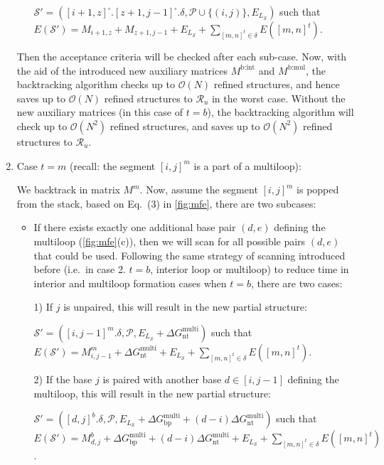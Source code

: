 \documentclass[11pt,letterpaper]{article}  \usepackage[margin=1in]{geometry}
\theoremstyle{definition}  \newtheorem{Definition}[theorem]{Definition}
\begin{document}
\begin{enumerate}
\begin{itemize}
		$\mathcal{S}' = ([i+1,z]^\square.[z+1,j-1]^\square.\delta, \mathcal{P} \cup \{(i,j)\}, E_{L_{\mathcal{S}}})$ such that $E(\mathcal{S}') = M_{i+1,z} +  M_{z+1,j-1} +  E_{L_{\mathcal{S}}} + \sum \limits_{[m,n]^t \in \delta} E([m,n]^t)$.   
		
		
		
	\end{itemize}
	
	Then the acceptance criteria will be checked after each sub-case. Now, with the aid of the introduced new auxiliary matrices $M^\text{b:int}$ and $M^\text{b:mul}$, the backtracking algorithm checks up to $\mathcal{O}(N)$ refined structures, and hence saves up to  $\mathcal{O}(N)$ refined structures to $\mathcal{R}_u$ in the worst case. Without the  new auxiliary matrices (in this case of $t=b$), the backtracking algorithm will check up to $\mathcal{O}(N^2)$ refined structures, and saves up to  $\mathcal{O}(N^2)$ refined structures to $\mathcal{R}_u$.
	
	
	\item
	Case $t = m$ 	(recall: the segment $[i,j]^m$ is a part of a multiloop): 
	
	We backtrack in matrix $M^m$. 
	Now, assume the segment $[i,j]^m$ is popped from the stack, based on Eq.~(3) in \cref{fig:mfe},  there are two subcases:
	
	\begin{itemize}
		\item  If there exists exactly one additional base pair $(d,e)$ defining the multiloop (\cref{fig:mfe}(c)), then we will scan for all possible pairs $(d,e)$ that could be used. Following the same strategy of scanning introduced before (i.e.~in case 2. $t=b$, interior loop or multiloop) to reduce time in interior and multiloop formation cases when $t = b$, there are two cases: 
		
		1) If $j$ is unpaired, this will
		result in the new partial structure: 
		
		$\mathcal{S}' = ([i,j-1]^m.\delta, \mathcal{P}, E_{L_{\mathcal{S}}} + \Delta G_\text{nt}^\text{multi})$ such that $E(\mathcal{S}') = M_{i,j-1}^m + \Delta G_\text{nt}^\text{multi} +E_{L_{\mathcal{S}}} + \sum \limits_{[m,n]^t \in \delta} E([m,n]^t)$. 	 	
		
		2) If the base $j$ is paired with another base $d \in [i,j-1]$ defining the multiloop, this will result in the new partial structure: 
		
		$\mathcal{S}' = ([d,j]^b.\delta, \mathcal{P}, E_{L_{\mathcal{S}}} + \Delta G_\text{bp}^\text{multi} + (d-i) \Delta G_\text{nt}^\text{multi})$ such that $E(\mathcal{S}') = M^b_{d,j} + \Delta G_\text{bp}^\text{multi}+ (d-i) \Delta G_\text{nt}^\text{multi} +E_{L_{\mathcal{S}}} 
		+ \sum \limits_{[m,n]^t \in \delta} E([m,n]^t)$. 
		

\end{itemize}
\end{enumerate}
\end{document}
